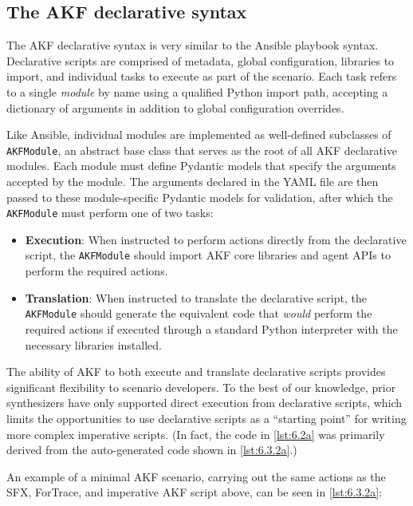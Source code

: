 \documentclass[letterpaper,12pt]{report}
\def\tightlist{}
\newcommand{\passthrough}[1]{#1}
\begin{document}
\subsection{The AKF declarative
syntax}\label{the-akf-declarative-syntax}

The AKF declarative syntax is very similar to the Ansible playbook
syntax. Declarative scripts are comprised of metadata, global
configuration, libraries to import, and individual tasks to execute as
part of the scenario. Each task refers to a single \emph{module} by name
using a qualified Python import path, accepting a dictionary of
arguments in addition to global configuration overrides.

Like Ansible, individual modules are implemented as well-defined
subclasses of \passthrough{\lstinline!AKFModule!}, an abstract base
class that serves as the root of all AKF declarative modules. Each
module must define Pydantic models that specify the arguments accepted
by the module. The arguments declared in the YAML file are then passed
to these module-specific Pydantic models for validation, after which the
\passthrough{\lstinline!AKFModule!} must perform one of two tasks:

\begin{itemize}
\tightlist
\item
  \textbf{Execution}: When instructed to perform actions directly from
  the declarative script, the \passthrough{\lstinline!AKFModule!} should
  import AKF core libraries and agent APIs to perform the required
  actions.
\item
  \textbf{Translation}: When instructed to translate the declarative
  script, the \passthrough{\lstinline!AKFModule!} should generate the
  equivalent code that \emph{would} perform the required actions if
  executed through a standard Python interpreter with the necessary
  libraries installed.
\end{itemize}

The ability of AKF to both execute and translate declarative scripts
provides significant flexibility to scenario developers. To the best of
our knowledge, prior synthesizers have only supported direct execution
from declarative scripts, which limits the opportunities to use
declarative scripts as a ``starting point'' for writing more complex
imperative scripts. (In fact, the code in \autoref{lst:6.2a} was
primarily derived from the auto-generated code shown in
\autoref{lst:6.3.2a}.)

An example of a minimal AKF scenario, carrying out the same actions as
the SFX, ForTrace, and imperative AKF script above, can be seen in
\autoref{lst:6.3.2a}:
\end{document}
